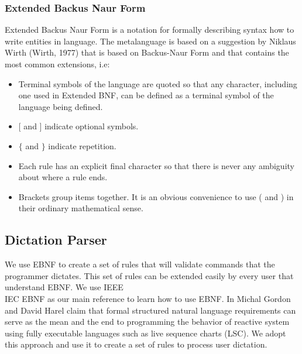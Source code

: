 \subsubsection{Extended Backus Naur Form}
Extended Backus Naur Form is a notation for formally describing syntax how to write entities in language. The metalanguage is based on a suggestion by Niklaus Wirth (Wirth, 1977) that is based on Backus-Naur Form and that contains the most common extensions, i.e:
\begin{itemize}
	\item Terminal symbols of the language are quoted so that any character,
	including one used in Extended BNF, can be defined as a terminal symbol of
	the language being defined.
	\item $ [ $ and $ ] $ indicate optional symbols.
	\item $ \{ $ and $ \} $ indicate repetition.
	\item Each rule has an explicit final character so that there is never any
	ambiguity about where a rule ends.
	\item Brackets group items together. It is an obvious convenience to use ( and ) in their ordinary mathematical sense.
\end{itemize}
\subsection{Dictation Parser}
We use EBNF to create a set of rules that will validate commands that the programmer dictates. This set of rules can be extended easily by every user that understand EBNF. We use IEEE\\IEC EBNF \cite{IEEEBNF1996} as our main reference to learn how to use EBNF. In \cite[pages 51-86]{Michal2009} Michal Gordon and David Harel claim that formal structured natural language requirements can serve as the mean and the end to programming the behavior of reactive system using fully executable languages such as live sequence charts (LSC). We adopt this approach and use it to create a set of rules to process user dictation.

